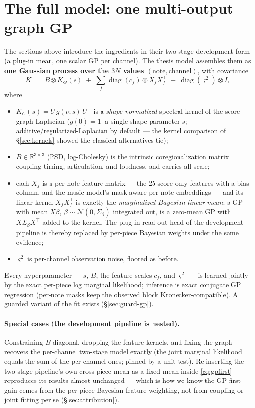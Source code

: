 \documentclass[11pt,a4paper]{report}
\begin{document}
\section{The full model: one multi-output graph GP}\label{sec:gpfirst}
The sections above introduce the ingredients in their two-stage development form
(a plug-in mean, one scalar GP per channel). The thesis model assembles them as
\textbf{one Gaussian process over the $3N$ values $(\text{note}, \text{channel})$},
with covariance
\begin{equation}
K \;=\; B \otimes K_G(s)\; +\; \sum_f \operatorname{diag}(c_f) \otimes X_f X_f^\top
\;+\; \operatorname{diag}(\varsigma^2) \otimes I ,
\label{eq:gpfirst}
\end{equation}
where
\begin{itemize}[leftmargin=*]
  \item $K_G(s) = U\, g(\nu; s)\, U^\top$ is a \emph{shape-normalized} spectral
        kernel of the score-graph Laplacian ($g(0)=1$, a single shape parameter
        $s$; additive/regularized-Laplacian by default --- the kernel comparison of
        \S\ref{sec:kernels} showed the classical alternatives tie);
  \item $B \in \mathbb{R}^{3\times 3}$ (PSD, log-Cholesky) is the intrinsic
        coregionalization matrix coupling timing, articulation, and loudness, and
        carries all scale;
  \item each $X_f$ is a per-note feature matrix --- the 25 score-only features with
        a bias column, and the music model's mask-aware per-note embeddings --- and
        its linear kernel $X_f X_f^\top$ is exactly the \emph{marginalized Bayesian
        linear mean}: a GP with mean $X\beta$, $\beta \sim \mathcal N(0, \Sigma_\beta)$
        integrated out, is a zero-mean GP with $X \Sigma_\beta X^\top$ added to the
        kernel. The plug-in read-out head of the development pipeline is thereby
        replaced by per-piece Bayesian weights under the same evidence;
  \item $\varsigma^2$ is per-channel observation noise, floored as before.
\end{itemize}
Every hyperparameter --- $s$, $B$, the feature scales $c_f$, and $\varsigma^2$ ---
is learned jointly by the exact per-piece log marginal likelihood; inference is
exact conjugate GP regression (per-note masks keep the observed block
Kronecker-compatible). A guarded variant of the fit exists
(\S\ref{sec:guard-gp}).

\paragraph{Special cases (the development pipeline is nested).} Constraining $B$
diagonal, dropping the feature kernels, and fixing the graph recovers the
per-channel two-stage model exactly (the joint marginal likelihood equals the sum
of the per-channel ones; pinned by a unit test). Re-inserting the two-stage
pipeline's own cross-piece mean as a fixed mean inside \eqref{eq:gpfirst}
reproduces its results almost unchanged --- which is how we know the GP-first gain
comes from the per-piece Bayesian feature weighting, not from coupling or joint
fitting per se (\S\ref{sec:attribution}).
\end{document}
